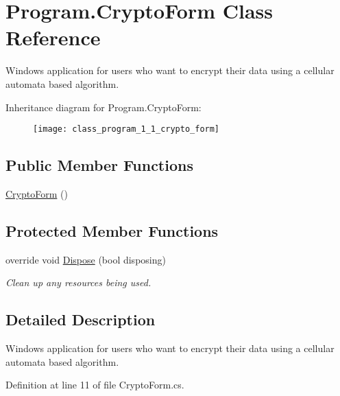 \hypertarget{class_program_1_1_crypto_form}{}\section{Program.\+Crypto\+Form Class Reference}
\label{class_program_1_1_crypto_form}


Windows application for users who want to encrypt their data using a cellular automata based algorithm.  


Inheritance diagram for Program.\+Crypto\+Form\+:\begin{figure}[H]
\begin{center}
\leavevmode
\texttt{[image: class\_program\_1\_1\_crypto\_form]}
\end{center}
\end{figure}
\subsection*{Public Member Functions}
\begin{DoxyCompactItemize}
\item 
\hyperlink{class_program_1_1_crypto_form_ab4de171d2fe2499055864e45f9efa4cc}{Crypto\+Form} ()
\end{DoxyCompactItemize}
\subsection*{Protected Member Functions}
\begin{DoxyCompactItemize}
\item 
override void \hyperlink{class_program_1_1_crypto_form_adaa80d92f4324b9d835d8125dcda4582}{Dispose} (bool disposing)
\begin{DoxyCompactList}\small\item\em Clean up any resources being used. \end{DoxyCompactList}\end{DoxyCompactItemize}


\subsection{Detailed Description}
Windows application for users who want to encrypt their data using a cellular automata based algorithm. 



Definition at line 11 of file Crypto\+Form.\+cs.



